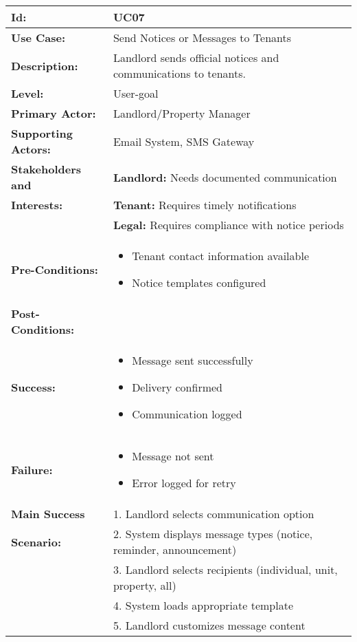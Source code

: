 \documentclass[12pt]{article}
\begin{document}
\begin{tabular}{|p{3cm}|p{11cm}|}
\hline
\textbf{Id:} & UC07 \\
\hline
\textbf{Use Case:} & Send Notices or Messages to Tenants \\
\hline
\textbf{Description:} & Landlord sends official notices and communications to tenants. \\
\hline
\textbf{Level:} & User-goal \\
\hline
\textbf{Primary Actor:} & Landlord/Property Manager \\
\hline
\textbf{Supporting Actors:} & Email System, SMS Gateway \\
\hline
\textbf{Stakeholders and} & \textbf{Landlord:} Needs documented communication \\
\textbf{Interests:} & \textbf{Tenant:} Requires timely notifications \\
& \textbf{Legal:} Requires compliance with notice periods \\
\hline
\textbf{Pre-Conditions:} & 
\begin{itemize}
    \item Tenant contact information available
    \item Notice templates configured
\end{itemize} \\
\hline
\textbf{Post-Conditions:} & \\
\textbf{Success:} & 
\begin{itemize}
    \item Message sent successfully
    \item Delivery confirmed
    \item Communication logged
\end{itemize} \\
\textbf{Failure:} & 
\begin{itemize}
    \item Message not sent
    \item Error logged for retry
\end{itemize} \\
\hline
\textbf{Main Success} & 1. Landlord selects communication option \\
\textbf{Scenario:} & 2. System displays message types (notice, reminder, announcement) \\
& 3. Landlord selects recipients (individual, unit, property, all) \\
& 4. System loads appropriate template \\
& 5. Landlord customizes message content \\

\end{tabular}
\end{document}
